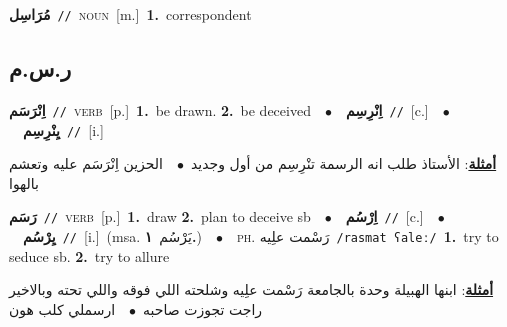 \documentclass[10pt,a4paper,twoside]{article} %
\begin{document}
\begin{multicols}{2}
{\setlength\topsep{0pt}\textbf{\foreignlanguage{arabic}{مُرَاسِل}}\ {\color{gray}\texttt{//}\color{black}}\ \textsc{noun}\ [m.]\ \textbf{1.}~correspondent\ } \vspace{2mm}

\vspace{-3mm}
\subsection*{\color{blue}\foreignlanguage{arabic}{ر.س.م}\color{blue}{}} 

{\setlength\topsep{0pt}\textbf{\foreignlanguage{arabic}{اِنْرَسَم}}\ {\color{gray}\texttt{//}\color{black}}\ \textsc{verb}\ [p.]\ \textbf{1.}~be drawn.  \textbf{2.}~be deceived\ \ $\bullet$\ \ \setlength\topsep{0pt}\textbf{\foreignlanguage{arabic}{اِنْرِسِم}}\ {\color{gray}\texttt{//}\color{black}}\ [c.]\ \ $\bullet$\ \ \setlength\topsep{0pt}\textbf{\foreignlanguage{arabic}{يِنْرِسِم}}\ {\color{gray}\texttt{//}\color{black}}\ [i.]\  \begin{flushright}\color{gray}\foreignlanguage{arabic}{\textbf{\underline{\foreignlanguage{arabic}{أمثلة}}}: الأستاذ طلب انه الرسمة تنْرِسِم من أول وجديد\ $\bullet$\ \  الحزين اِنْرَسَم عليه وتعشم بالهوا}\end{flushright}\color{black}} \vspace{2mm}

{\setlength\topsep{0pt}\textbf{\foreignlanguage{arabic}{رَسَم}}\ {\color{gray}\texttt{//}\color{black}}\ \textsc{verb}\ [p.]\ \textbf{1.}~draw  \textbf{2.}~plan to deceive sb\ \ $\bullet$\ \ \setlength\topsep{0pt}\textbf{\foreignlanguage{arabic}{اِرْسُم}}\ {\color{gray}\texttt{//}\color{black}}\ [c.]\ \ $\bullet$\ \ \setlength\topsep{0pt}\textbf{\foreignlanguage{arabic}{يِرْسُم}}\ {\color{gray}\texttt{//}\color{black}}\ [i.]\ \color{gray}(msa. \foreignlanguage{arabic}{يَرْسُم}~\foreignlanguage{arabic}{\textbf{١.}})\color{black}\ \ $\bullet$\ \ \textsc{ph.} \color{gray} \foreignlanguage{arabic}{رَسْمت علِيه}\color{black}\ {\color{gray}\texttt{/{\sffamily rasmat ʕaleː}/}\color{black}}\ \textbf{1.}~try to seduce sb.  \textbf{2.}~try to allure\  \begin{flushright}\color{gray}\foreignlanguage{arabic}{\textbf{\underline{\foreignlanguage{arabic}{أمثلة}}}: ابنها الهبيلة وحدة بالجامعة رَسْمت علِيه وشلحته اللي فوقه واللي تحته وبالاخير راجت تجوزت صاحبه\ $\bullet$\ \  ارسملي كلب هون}\end{flushright}\color{black}} \vspace{2mm}


\end{multicols}
\end{document}
